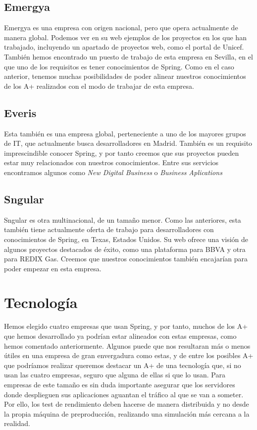 \documentclass[a4paper]{article}
\begin{document}
\subsection{Emergya}
Emergya es una empresa con origen nacional, pero que opera actualmente de manera global. Podemos ver en su web ejemplos de los proyectos en los que han trabajado, incluyendo un apartado de proyectos web, como el portal de Unicef. También hemos encontrado un puesto de trabajo de esta empresa en Sevilla, en el que uno de los requisitos es tener conocimientos de Spring. Como en el caso anterior, tenemos muchas posibilidades de poder alinear nuestros conocimientos de los A+ realizados con el modo de trabajar de esta empresa.

\subsection{Everis}
Esta también es una empresa global, perteneciente a uno de los mayores grupos de IT, que actualmente busca desarrolladores en Madrid. También es un requisito imprescindible conocer Spring, y por tanto creemos que sus proyectos pueden estar muy relacionados con nuestros conocimientos. Entre sus servicios encontramos algunos como \textit{New Digital Business} o \textit{Business Aplications}

\subsection{Sngular}
Sngular es otra multinacional, de un tamaño menor. Como las anteriores, esta también tiene actualmente oferta de trabajo para desarrolladores con conocimientos de Spring, en Texas, Estados Unidos. Su web ofrece una visión de algunos proyectos destacados de éxito, como una plataforma para BBVA y otra para REDIX Gas. Creemos que nuestros conocimientos también encajarían para poder empezar en esta empresa.

\section{Tecnología}
Hemos elegido cuatro empresas que usan Spring, y por tanto, muchos de los A+ que hemos desarrollado ya podrían estar alineados con estas empresas, como hemos comentado anteriormente. Algunos puede que nos resultaran más o menos útiles en una empresa de gran envergadura como estas, y de entre los posibles A+ que podríamos realizar queremos destacar un A+ de una tecnología que, si no usan las cuatro empresas, seguro que alguna de ellas si que lo usan. Para empresas de este tamaño es sin duda importante asegurar que los servidores donde desplieguen sus aplicaciones aguantan el tráfico al que se van a someter. Por ello, los test de rendimiento deben hacerse de manera distribuida y no desde la propia máquina de preproducción, realizando una simulación más cercana a la realidad. 
\end{document}
